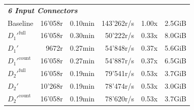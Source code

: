 \begin{longtable}{lrrrrr}
    \multicolumn{6}{l}{\textit{\textbf{6 Input Connectors}}} \\
    \nopagebreak
    Baseline              &  16'058r              &  0.10min            &  143'262r/s          & 1.00x             & 2.5GiB    \\
    $D_1'^{\text{full}}$   &  16'058r              &  0.30min            &  50'222r/s           & 0.33x             & 8.0GiB   \\
    \quad $D_1'$           &  9672r                &  0.27min            &  54'848r/s           & 0.37x             & 5.6GiB    \\
    $D_1'^{\text{count}}$  &  16'058r              &  0.27min            &  54'887r/s           & 0.37x             & 6.5GiB    \\
    $D_2'^{\text{full}}$   &  16'058r              &  0.19min            &  79'541r/s           & 0.53x             & 3.7GiB    \\
    \quad $D_2'$           &  10'268r              &  0.19min            &  78'474r/s           & 0.53x             & 3.0GiB    \\
    $D_2'^{\text{count}}$  &  16'058r              &  0.19min            &  78'620r/s           & 0.53x             & 3.7GiB    \\
  
    \bottomrule

\end{longtable}

